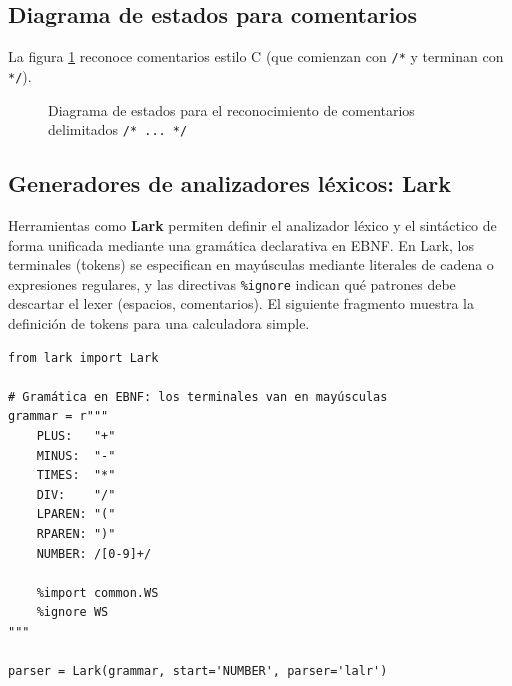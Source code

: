 \subsection{Diagrama de estados para comentarios}

La figura \ref{fig:state-diagram-comment} reconoce comentarios estilo C (que comienzan con \texttt{/*} y terminan con \texttt{*/}).

\begin{figure}[htbp]
  \centering
  \caption{Diagrama de estados para el reconocimiento de comentarios delimitados \texttt{/* ... */}}
  \label{fig:state-diagram-comment}
\end{figure}

\subsection{Generadores de analizadores léxicos: Lark}

Herramientas como \textbf{Lark} \cite{lark2025} permiten definir el analizador léxico y el sintáctico de forma unificada mediante una gramática declarativa en EBNF. En Lark, los terminales (tokens) se especifican en mayúsculas mediante literales de cadena o expresiones regulares, y las directivas \texttt{\%ignore} indican qué patrones debe descartar el lexer (espacios, comentarios). El siguiente fragmento muestra la definición de tokens para una calculadora simple.

\begin{lstlisting}[style=python, caption={Definición de tokens con Lark}]
from lark import Lark

# Gramática en EBNF: los terminales van en mayúsculas
grammar = r"""
    PLUS:   "+"
    MINUS:  "-"
    TIMES:  "*"
    DIV:    "/"
    LPAREN: "("
    RPAREN: ")"
    NUMBER: /[0-9]+/

    %import common.WS
    %ignore WS
"""

parser = Lark(grammar, start='NUMBER', parser='lalr')
\end{lstlisting}

